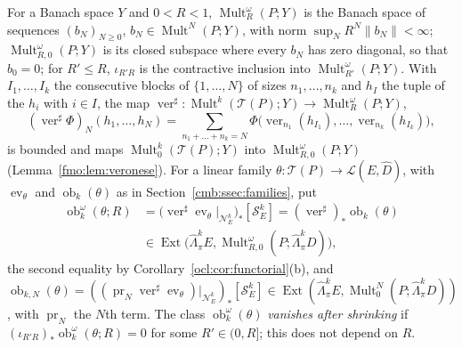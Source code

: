 \documentclass[11pt]{amsart}
\theoremstyle{definition}
\theoremstyle{remark}
\numberwithin{equation}{section}
\newcommand{\cL}{\mathcal L}
\newcommand{\Mult}{\operatorname{Mult}}
\newcommand{\norm}[1]{\lVert #1\rVert}
\theoremstyle{plain}
\theoremstyle{definition}
\theoremstyle{plain}
\newcommand{\ev}{\operatorname{ev}}
\newcommand{\ob}{\operatorname{ob}}
\newcommand{\Ext}{\operatorname{Ext}}
\newcommand{\hLambda}{\widehat\Lambda}
\newcommand{\cN}{\mathcal N}
\newcommand{\cS}{\mathcal S}
\begin{document}
For a Banach space $Y$ and $0<R<1$, $\Mult^\omega_R(P;Y)$ is the Banach space of sequences $(b_N)_{N\ge0}$,
$b_N\in\Mult^N(P;Y)$, with norm $\sup_NR^N\norm{b_N}<\infty$; $\Mult^\omega_{R,0}(P;Y)$ is its closed subspace where every
$b_N$ has zero diagonal, so that $b_0=0$; for $R'\le R$, $\iota_{R'R}$ is the contractive inclusion into
$\Mult^\omega_{R'}(P;Y)$. With $I_1,\dots,I_k$ the consecutive blocks of $\{1,\dots,N\}$ of sizes $n_1,\dots,n_k$ and $h_I$
the tuple of the $h_i$ with $i\in I$, the map $\operatorname{ver}^\sharp\colon\Mult^k(\mathcal T(P);Y)\to\Mult^\omega_R(P;Y)$,
\[
 (\operatorname{ver}^\sharp\Phi)_N(h_1,\dots,h_N)=\sum_{n_1+\dots+n_k=N}
 \Phi\bigl(\operatorname{ver}_{n_1}(h_{I_1}),\dots,\operatorname{ver}_{n_k}(h_{I_k})\bigr),
\]
is bounded and maps $\Mult^k_0(\mathcal T(P);Y)$ into $\Mult^\omega_{R,0}(P;Y)$ (Lemma~\ref{fmo:lem:veronese}). For a linear
family $\theta\colon\mathcal T(P)\to\cL(E,\widehat D)$, with $\ev_\theta$ and $\ob_k(\theta)$ as in
Section~\ref{cmb:ssec:families}, put
\begin{equation}\label{fam2:eq:class}
\begin{split}
 \ob^\omega_k(\theta;R)&=\bigl(\operatorname{ver}^\sharp\ev_\theta|_{\cN^k_E}\bigr)_*[\cS^k_E]
 =(\operatorname{ver}^\sharp)_*\ob_k(\theta)\\
 &\in\Ext\bigl(\hLambda^k_\pi E,\Mult^\omega_{R,0}(P;\hLambda^k_\pi D)\bigr),
\end{split}
\end{equation}
the second equality by Corollary~\ref{ocl:cor:functorial}(b), and
$\ob_{k,N}(\theta)=((\operatorname{pr}_N\operatorname{ver}^\sharp\ev_\theta)|_{\cN^k_E})_*[\cS^k_E]
\in\Ext(\hLambda^k_\pi E,\allowbreak\Mult^N_0(P;\hLambda^k_\pi D))$, with $\operatorname{pr}_N$ the $N$th term. The class
$\ob^\omega_k(\theta)$ \emph{vanishes after shrinking} if $(\iota_{R'R})_*\ob^\omega_k(\theta;R)=0$ for some
$R'\in(0,R]$; this does not depend on $R$.
\end{document}
